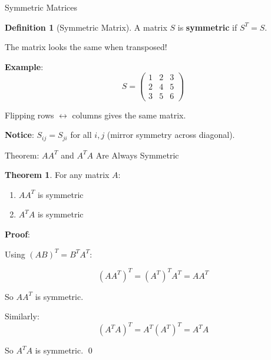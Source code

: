 \documentclass[10pt]{beamer}
\theoremstyle{definition}
\newtheorem{defi}{Definition}[section]
\newtheorem{thm}{Theorem}[section]
\newcommand{\x}[1]{\alert{\textbf{#1}}}
\begin{document}
\begin{frame}{Symmetric Matrices}

\begin{defi}[Symmetric Matrix]
A matrix $S$ is \x{symmetric} if $S^T = S$.

The matrix looks the same when transposed!
\end{defi}

\vspace{1em}

\x{Example}:
$$S = \begin{pmatrix} 1 & 2 & 3 \\ 2 & 4 & 5 \\ 3 & 5 & 6 \end{pmatrix}$$

Flipping rows $\leftrightarrow$ columns gives the same matrix.

\vspace{1em}

\x{Notice}: $S_{ij} = S_{ji}$ for all $i, j$ (mirror symmetry across diagonal).

\end{frame}

\begin{frame}{Theorem: $AA^T$ and $A^T A$ Are Always Symmetric}

\begin{thm}
For any matrix $A$:
\begin{enumerate}
\item $AA^T$ is symmetric
\item $A^T A$ is symmetric
\end{enumerate}
\end{thm}

\vspace{1em}

\x{Proof}:

Using $(AB)^T = B^T A^T$:

$$(AA^T)^T = (A^T)^T A^T = A A^T$$

So $AA^T$ is symmetric.

\vspace{1em}

Similarly:
$$(A^T A)^T = A^T (A^T)^T = A^T A$$

So $A^T A$ is symmetric. \qed

\end{frame}
\end{document}
